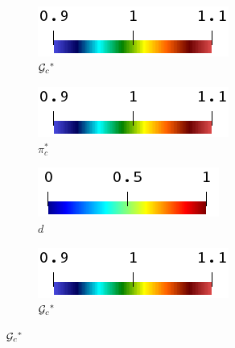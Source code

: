 
\begin{figure}[!htb]
    \centering
    \begin{subfigure}[b]{0.15\textwidth}
        \caption*{${\mathcal{G}_c}^*$}
        \includegraphics[width=\textwidth]{colorbar/rainbow_horizontal.png}
    \end{subfigure}
    \begin{subfigure}[b]{0.15\textwidth}
        \caption*{$\pi_c^*$}
        \includegraphics[width=\textwidth]{colorbar/rainbow_horizontal.png}
    \end{subfigure}
    \begin{subfigure}[b]{0.15\textwidth}
        \caption*{$d$}
        \includegraphics[width=\textwidth]{colorbar/jet_horizontal.png}
    \end{subfigure}
    \begin{subfigure}[b]{0.15\textwidth}
        \caption*{${\mathcal{G}_c}^*$}
        \includegraphics[width=\textwidth]{colorbar/rainbow_horizontal.png}
    \end{subfigure}

\end{figure}
